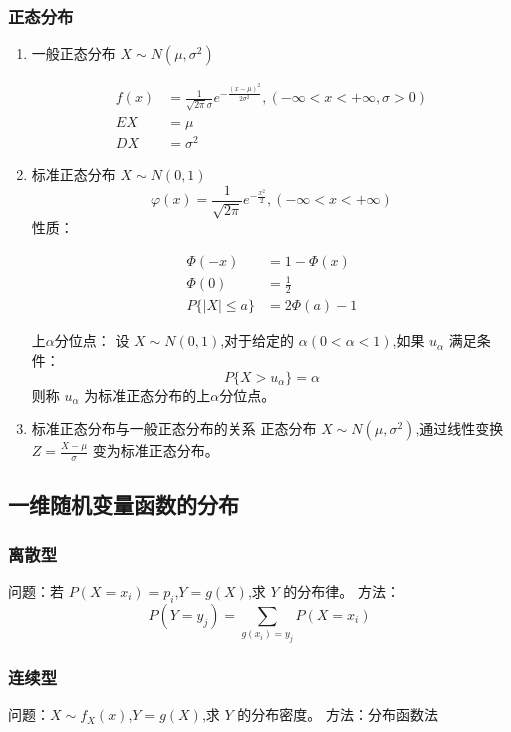 \documentclass[UTF8]{ctexart}
\theoremstyle{remark}
\begin{document}
		\subsubsection{正态分布}
		\begin{enumerate}
			\item 一般正态分布 \(X \sim N(\mu, \sigma^2)\)
			
			\begin{align*}
				f(x) &= \frac{1}{\sqrt{2\pi}\sigma} e^{-\frac{(x - \mu)^2}{2\sigma^2}}, (-\infty < x < +\infty, \sigma > 0)\\
				EX &= \mu\\
				DX &= \sigma^2
			\end{align*}
			
			\item 标准正态分布 \(X \sim N(0, 1)\)
			\[
			\varphi(x) = \frac{1}{\sqrt{2\pi}} e^{-\frac{x^2}{2}}, (-\infty < x < +\infty)
			\]
			性质：
			
			\begin{align*}
				\varPhi(-x) &= 1 - \varPhi(x)\\
				\varPhi(0) &= \frac{1}{2}\\
				P\{|X| \leq a\} &= 2\varPhi(a) - 1
			\end{align*}
			
			上\(\alpha\)分位点：
			设 \(X \sim N(0,1)\),对于给定的 \(\alpha(0 < \alpha < 1)\),如果 \(u_{\alpha}\) 满足条件：
			\[
			P\{X > u_{\alpha}\} = \alpha
			\]
			则称 \(u_{\alpha}\) 为标准正态分布的上\(\alpha\)分位点。
			\item 标准正态分布与一般正态分布的关系
			正态分布 \(X \sim N(\mu, \sigma^2)\),通过线性变换 \(Z = \frac{X - \mu}{\sigma}\) 变为标准正态分布。
		\end{enumerate}
		
		\subsection{一维随机变量函数的分布}
		\subsubsection{离散型}
		问题：若 \(P(X = x_i) = p_i\),\(Y = g(X)\),求 \(Y\) 的分布律。
		方法：
		\[
		P(Y = y_j) = \sum_{g(x_i) = y_j} P(X = x_i)
		\]
	
		\subsubsection{连续型}
		问题：\(X \sim f_X(x)\),\(Y = g(X)\),求 \(Y\) 的分布密度。
		方法：分布函数法
		
\end{document}
